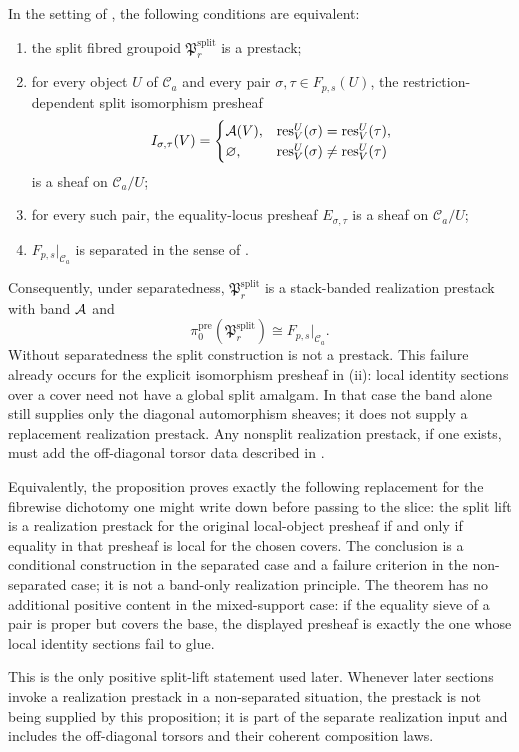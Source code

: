 \begin{proposition}\label{prop:split-realization-prestack}
In the setting of , the following conditions are equivalent:
\begin{enumerate}[label=(\roman*),nosep]
\item the split fibred groupoid $\mathfrak P_r^{\mathrm{split}}$ is a prestack;
\item for every object $U$ of $\mathcal C_a$ and every pair $\sigma,\tau\in F_{p,s}(U)$, the restriction-dependent split isomorphism presheaf
\[
I_{\sigma,\tau}(V)=
\begin{cases}
\mathcal{A}(V), & \mathrm{res}_V^U(\sigma)=\mathrm{res}_V^U(\tau),\\
\varnothing, & \mathrm{res}_V^U(\sigma)\neq\mathrm{res}_V^U(\tau)
\end{cases}
\]
is a sheaf on $\mathcal C_a/U$;
\item for every such pair, the equality-locus presheaf $E_{\sigma,\tau}$ is a sheaf on $\mathcal C_a/U$;
\item $F_{p,s}|_{\mathcal C_a}$ is separated in the sense of .
\end{enumerate}
Consequently, under separatedness, $\mathfrak P_r^{\mathrm{split}}$ is a
stack-banded realization prestack with band $\mathcal{A}$ and
\[
\pi_0^{\mathrm{pre}}(\mathfrak P_r^{\mathrm{split}})
\cong
F_{p,s}|_{\mathcal C_a}.
\]
Without separatedness the split construction is not a prestack. This failure
already occurs for the explicit isomorphism presheaf in \textup{(ii)}: local
identity sections over a cover need not have a global split amalgam. In that
case the band alone still supplies only the diagonal automorphism sheaves; it
does not supply a replacement realization prestack. Any nonsplit realization
prestack, if one exists, must add the off-diagonal torsor data described in
.

Equivalently, the proposition proves exactly the following replacement for the
fibrewise dichotomy one might write down before passing to the slice: the split
lift is a realization prestack for the original local-object presheaf if and only
if equality in that presheaf is local for the chosen covers. The conclusion is a
conditional construction in the separated case and a failure criterion in the
non-separated case; it is not a band-only realization principle. The theorem has
no additional positive content in the mixed-support case: if the equality sieve
of a pair is proper but covers the base, the displayed presheaf is exactly the
one whose local identity sections fail to glue.

This is the only positive split-lift statement used later. Whenever later
sections invoke a realization prestack in a non-separated situation, the
prestack is not being supplied by this proposition; it is part of the separate
realization input and includes the off-diagonal torsors and their coherent
composition laws.
\end{proposition}


